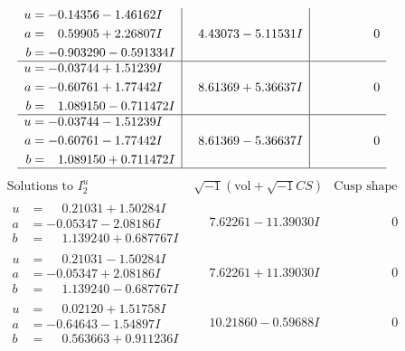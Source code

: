 \documentclass[1p]{elsarticle_modified}
\theoremstyle{definition}
\newcommand{\I}{\sqrt{-1}}
\begin{document}
$$\begin{array}{c|c|c}
\begin{aligned}
u &= -0.14356 - 1.46162 I \\
a &= \phantom{-}0.59905 + 2.26807 I \\
b &= -0.903290 - 0.591334 I\end{aligned}
 & \phantom{-}4.43073 - 5.11531 I & \phantom{-0.000000 } 0 \\ \hline\begin{aligned}
u &= -0.03744 + 1.51239 I \\
a &= -0.60761 + 1.77442 I \\
b &= \phantom{-}1.089150 - 0.711472 I\end{aligned}
 & \phantom{-}8.61369 + 5.36637 I & \phantom{-0.000000 } 0 \\ \hline\begin{aligned}
u &= -0.03744 - 1.51239 I \\
a &= -0.60761 - 1.77442 I \\
b &= \phantom{-}1.089150 + 0.711472 I\end{aligned}
 & \phantom{-}8.61369 - 5.36637 I & \phantom{-0.000000 } 0\\
 \hline 
 \end{array}$$\newpage$$\begin{array}{c|c|c}  
\text{Solutions to }I^u_{2}& \I (\text{vol} + \sqrt{-1}CS) & \text{Cusp shape}\\
 \hline 
\begin{aligned}
u &= \phantom{-}0.21031 + 1.50284 I \\
a &= -0.05347 - 2.08186 I \\
b &= \phantom{-}1.139240 + 0.687767 I\end{aligned}
 & \phantom{-}7.62261 - 11.39030 I & \phantom{-0.000000 } 0 \\ \hline\begin{aligned}
u &= \phantom{-}0.21031 - 1.50284 I \\
a &= -0.05347 + 2.08186 I \\
b &= \phantom{-}1.139240 - 0.687767 I\end{aligned}
 & \phantom{-}7.62261 + 11.39030 I & \phantom{-0.000000 } 0 \\ \hline\begin{aligned}
u &= \phantom{-}0.02120 + 1.51758 I \\
a &= -0.64643 - 1.54897 I \\
b &= \phantom{-}0.563663 + 0.911236 I\end{aligned}
 & \phantom{-}10.21860 - 0.59688 I & \phantom{-0.000000 } 0 \\ \hline\begin{aligned}

\end{aligned}
\end{array}$$
\end{document}
